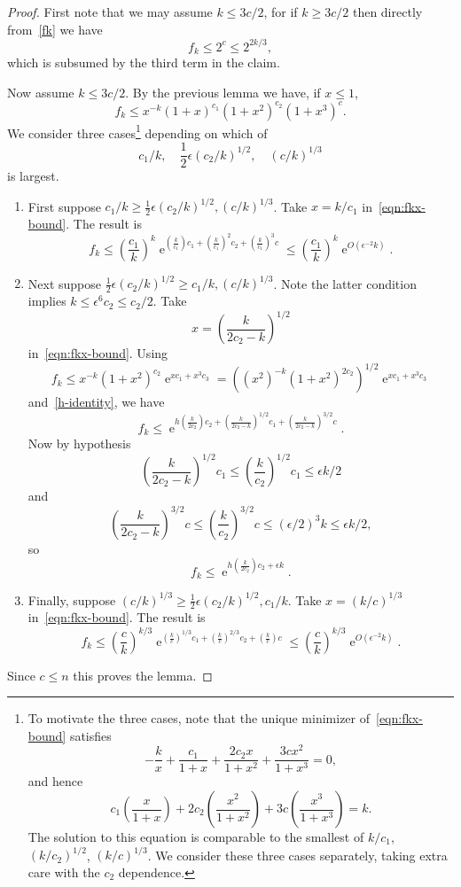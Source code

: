 \documentclass[10pt,a4paper]{amsart}
\theoremstyle{remark}
\DeclareMathOperator{\expe}{e}
\newcommand{\eps}{\epsilon}
\newcommand\br[1]{\left({#1}\right)}
\newcommand\pfrac[2]{\br{\frac{#1}{#2}}}
\begin{document}
\begin{proof}
First note that we may assume $k \leq 3c/2$, for if $k \geq 3c/2$ then directly from~\eqref{fk} we have
\[
 f_k \leq 2^c \leq 2^{2k/3},
\]
which is subsumed by the third term in the claim.

Now assume $k \leq 3c/2$. By the previous lemma we have, if $x \leq 1$,
\begin{equation} \label{eqn:fkx-bound}
 f_k \leq x^{-k} (1+x)^{c_1} (1+x^2)^{c_2} (1+x^3)^{c}.
\end{equation}
We consider three cases\footnote{To motivate the three cases, note that the unique minimizer of~\eqref{eqn:fkx-bound} satisfies
\[
-\frac{k}{x} + \frac{c_1}{1+x} + \frac{2c_2 x}{1+x^2} + \frac{3c x^2}{1+x^3} = 0,
\]
and hence
\[
 c_1 \pfrac{x}{1+x} + 2c_2 \pfrac{x^2}{1+x^2} + 3c \pfrac{x^3}{1+x^3} = k.
\]
The solution to this equation is comparable to the smallest of $k/c_1$, $(k/c_2)^{1/2}$, $(k/c)^{1/3}$.
We consider these three cases separately, taking extra care with the $c_2$ dependence.}
depending on which of
\[
 c_1/k,\quad \frac12 \eps (c_2 / k)^{1/2},\quad (c / k)^{1/3}
\]
is largest.
\begin{enumerate}
 \item\label{proof_lemm3.2_1} First suppose $c_1 / k \geq \frac12 \eps (c_2 / k)^{1/2}, (c / k)^{1/3}$. Take $x = k / c_1$ in~\eqref{eqn:fkx-bound}. The result is
 \[
 f_k \leq \pfrac{c_1}{k}^k \expe^{\pfrac{k}{c_1} c_1 + \pfrac{k}{c_1}^2 c_2 + \pfrac{k}{c_1}^3 c} \leq \pfrac{c_1}{k}^k \expe^{O(\eps^{-2} k)}.
 \]
 \item\label{proof_lemm3.2_2} Next suppose $\frac12 \eps(c_2 / k)^{1/2} \geq c_1/k, (c/k)^{1/3}$. Note the latter condition implies $k \leq \eps^6 c_2 \leq c_2 / 2$. Take
 \[
 x = \pfrac{k}{2c_2 - k}^{1/2}
 \]
 in~\eqref{eqn:fkx-bound}. Using
 \[
 f_k \leq x^{-k} (1+x^2)^{c_2} \expe^{x c_1 + x^3 c_3}
 = \br{(x^2)^{-k} (1+x^2)^{2c_2}}^{1/2} \expe^{x c_1 + x^3 c_3}
 \]
 and~\eqref{h-identity}, we have
 \[
 f_k
 \leq \expe^{h \pfrac{k}{2c_2} c_2 + \pfrac{k}{2c_2-k}^{1/2} c_1 + \pfrac{k}{2c_2-k}^{3/2} c}.
 \]
 Now by hypothesis
 \[
 \pfrac{k}{2c_2 - k}^{1/2} c_1 \leq \pfrac{k}{c_2}^{1/2} c_1 \leq \eps k / 2
 \]
 and
 \[
 \pfrac{k}{2c_2-k}^{3/2} c \leq \pfrac{k}{c_2}^{3/2} c \leq (\eps / 2)^3 k \leq \eps k / 2,
 \]
 so
 \[
 f_k \leq \expe^{h \pfrac{k}{2c_2} c_2 + \eps k}.
 \]
 \item\label{proof_lemm3.2_3} Finally, suppose $(c / k)^{1/3} \geq \frac12 \eps (c_2 / k)^{1/2}, c_1 / k$. Take $x = (k/c)^{1/3}$ in~\eqref{eqn:fkx-bound}. The result is
 \[
 f_k \leq \pfrac{c}{k}^{k/3} \expe^{\pfrac{k}{c}^{1/3} c_1 + \pfrac{k}{c}^{2/3} c_2 + \pfrac{k}{c} c} \leq \pfrac{c}{k}^{k/3} \expe^{O(\eps^{-2} k)}.
 \]
\end{enumerate}
Since $c \leq n$ this proves the lemma.
\end{proof}
\end{document}

